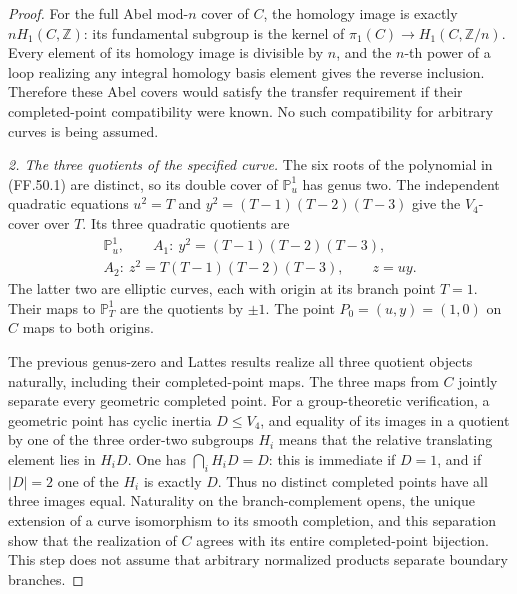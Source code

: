 \begin{proof}
For the full Abel mod-\(n\) cover of \(C\), the
homology image is exactly \(nH_1(C,\mathbb Z)\):
its fundamental subgroup is the kernel of
\(\pi_1(C)\to H_1(C,\mathbb Z/n)\).
Every element of its homology image is divisible by
\(n\), and the \(n\)-th power of a loop realizing
any integral homology basis element gives the reverse
inclusion. Therefore these Abel covers would satisfy
the transfer requirement if their completed-point
compatibility were known. No such compatibility for
arbitrary curves is being assumed.

\emph{2. The three quotients of the specified curve.}
The six roots of the polynomial in (FF.50.1) are
distinct, so its double cover of \(\mathbb P^1_u\)
has genus two. The independent quadratic equations
\(u^2=T\) and \(y^2=(T-1)(T-2)(T-3)\) give
the \(V_4\)-cover over \(T\). Its three quadratic
quotients are
\[
 \begin{gathered}
 \mathbb P^1_u,\qquad A_1:\ y^2=(T-1)(T-2)(T-3),\\
 A_2:\ z^2=T(T-1)(T-2)(T-3),\qquad z=uy.
 \end{gathered}
                                                        \tag{FF.50.6}
\]
The latter two are elliptic curves, each with origin
at its branch point \(T=1\). Their maps to
\(\mathbb P^1_T\) are the quotients by \(\pm1\).
The point \(P_0=(u,y)=(1,0)\) on \(C\) maps to
both origins.

The previous genus-zero and Lattes results realize
all three quotient objects naturally, including
their completed-point maps. The three maps from
\(C\) jointly separate every geometric completed
point. For a group-theoretic verification, a
geometric point has cyclic inertia \(D\leq V_4\),
and equality of its images in a quotient by one
of the three order-two subgroups \(H_i\) means
that the relative translating element lies in
\(H_iD\). One has
\(\bigcap_iH_iD=D\): this is immediate if
\(D=1\), and if \(|D|=2\) one of the \(H_i\)
is exactly \(D\). Thus no distinct completed
points have all three images equal. Naturality
on the branch-complement opens, the unique
extension of a curve isomorphism to its smooth
completion, and this separation show that the
realization of \(C\) agrees with its entire
completed-point bijection. This step does not
assume that arbitrary normalized products
separate boundary branches.


\end{proof}
